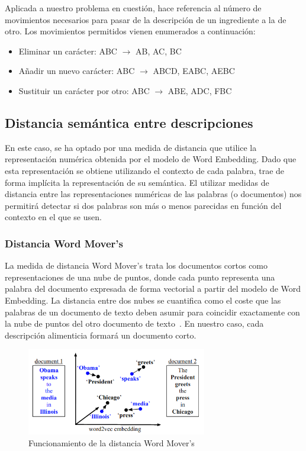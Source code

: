 Aplicada a nuestro problema en cuestión, hace referencia al número de movimientos necesarios para pasar de la descripción de un ingrediente a la de otro. Los movimientos permitidos vienen enumerados a continuación:

\begin{itemize}
    \item Eliminar un carácter: ABC $\xrightarrow{}$ AB, AC, BC
    \item Añadir un nuevo carácter: ABC $\xrightarrow{}$ ABCD, EABC, AEBC
    \item Sustituir un carácter por otro: ABC $\xrightarrow{}$ ABE, ADC, FBC
\end{itemize}


\subsection{Distancia semántica entre descripciones}

En este caso, se ha optado por una medida de distancia que utilice la representación numérica obtenida por el modelo de Word Embedding. Dado que esta representación se obtiene utilizando el contexto de cada palabra, trae de forma implícita la representación de su semántica. El utilizar medidas de distancia entre las representaciones numéricas de las palabras (o documentos) nos permitirá detectar si dos palabras son más o menos parecidas en función del contexto en el que se usen. 



\subsubsection{Distancia Word Mover's}

La medida de distancia Word Mover's trata los documentos cortos como representaciones de una nube de puntos, donde cada punto representa una palabra del documento expresada de forma vectorial a partir del modelo de Word Embedding. La distancia entre dos nubes se cuantifica como el coste que las palabras de un documento de texto deben asumir para coincidir exactamente con la nube de puntos del otro documento de texto~\cite{kusner2015word}. En nuestro caso, cada descripción alimenticia formará un documento corto.

\begin{figure}[H]
    \centering
    \includegraphics[width=0.7\textwidth]{imagenes/wmd.png}
    \caption{Funcionamiento de la distancia Word Mover's ~\cite{kusner2015word}}
    \label{fig:wmd}
\end{figure}

